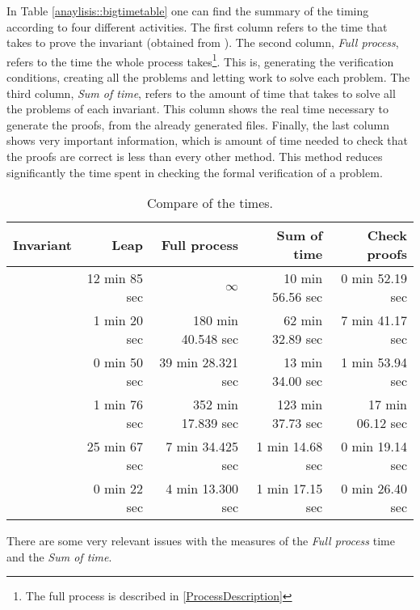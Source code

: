 In Table \ref{anaylisis::bigtimetable} one can find the summary of the timing according to four different activities. The first column refers to the time that \leap takes to prove the invariant (obtained from \cite{paperParametrizedInvariants}). 
%
The second column, \textit{Full process}, refers to the time the whole process takes\footnote{The full process is described in \ref{ProcessDescription}}. 
%
This is, generating the verification conditions, creating all the \spass problems and letting \spass work to solve each problem.
%
The third column, \textit{Sum of \spass time}, refers to the amount of time that \spass takes to solve all the problems of each invariant.
%
This column shows the real time necessary to generate the proofs, from the already generated files.
%
Finally, the last column shows very important information,
%
which is amount of time needed to check that the proofs are correct is less than every other method. 
%
This method reduces significantly the time spent in checking the formal verification of a problem.


\begin{table}[hbtp]
\centering
\begin{tabular}{r|rrrr}
Invariant 		& Leap 	& Full process 		& Sum of \spass time 	& Check proofs 	\\\hline
\invPreserve 	& 12 min 85	sec & $\infty$			& 10 min 56.56 sec				& 0 min 52.19 sec		\\
\invOrder		& 1 min 20	sec & 180 min 40.548 sec		& 62 min 32.89 sec				& 7 min 41.17 sec 		\\
\invLock		& 0 min 50	sec & 39 min 28.321 sec			& 13 min 34.00 sec 				& 1 min 53.94 sec		\\
\invNext 		& 1 min 76	sec & 352 min 17.839 sec		& 123 min 37.73 sec				& 17 min 06.12 sec		\\
\invRegion		& 25 min 67	sec & 7 min 34.425 sec			& 1 min 14.68 sec				& 0 min 19.14 sec		\\
\invDisjoint 	& 0 min 22 	sec & 4 min 13.300 sec 			& 1 min 17.15 sec 				& 0 min 26.40 sec		\\
\end{tabular}
\caption{Compare of the times.}
\label{analysis:bigtimetable}
\end{table}


There are some very relevant issues with the measures of the \textit{Full process} time and the \textit{Sum of \spass time}.

